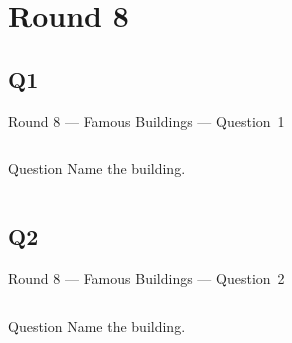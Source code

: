 \documentclass[11pt,draft]{beamer}
\begin{document}
\section{Round 8}
\subsection*{Q1}
\begin{frame}[t]{Round 8 --- Famous Buildings --- \mbox{Question 1}}
    \begin{columns}[T,totalwidth=\linewidth]
        \begin{column}{0.32\linewidth}
            \begin{block}{Question}
                Name the building.
            \end{block}
        \end{column}
        \begin{column}{0.65\linewidth}
            \begin{center}
                \texttt{[image: \{Images/pompidou]}.jpg}
            \end{center}
        \end{column}
    \end{columns}
\end{frame}
\subsection*{Q2}
\begin{frame}[t]{Round 8 --- Famous Buildings --- \mbox{Question 2}}
    \begin{columns}[T,totalwidth=\linewidth]
        \begin{column}{0.32\linewidth}
            \begin{block}{Question}
                Name the building.
            \end{block}
        \end{column}
        \begin{column}{0.65\linewidth}
            \begin{center}
                \texttt{[image: \{Images/disneyconcerthall]}.jpg}
            \end{center}
        \end{column}
    \end{columns}
\end{frame}
\end{document}

